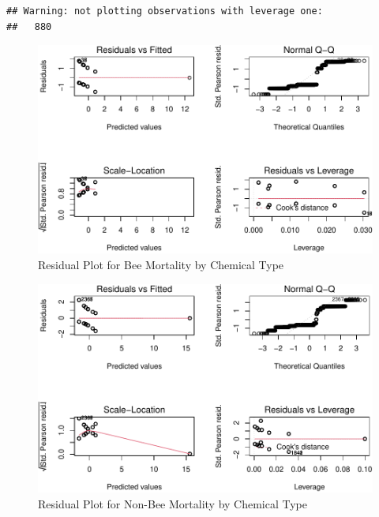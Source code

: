 \documentclass[
  12pt,
]{article}
\begin{document}
\begin{verbatim}
## Warning: not plotting observations with leverage one:
##   880
\end{verbatim}

\begin{figure}
\centering
\includegraphics{UpdatedwithModel_files/figure-latex/unnamed-chunk-10-1.pdf}
\caption{Residual Plot for Bee Mortality by Chemical Type}
\end{figure}

\begin{figure}
\centering
\includegraphics{UpdatedwithModel_files/figure-latex/unnamed-chunk-11-1.pdf}
\caption{Residual Plot for Non-Bee Mortality by Chemical Type}
\end{figure}
\end{document}
